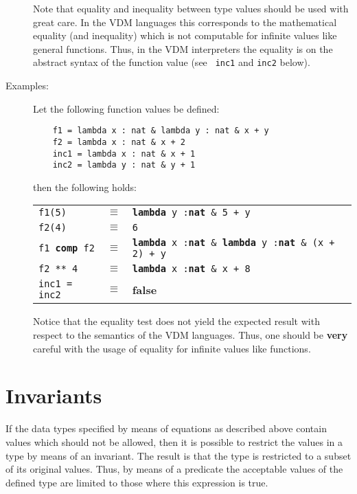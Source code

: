\documentclass{overturerepchap}
\newcommand{\keyw}[1]{{\bf\ttfamily #1}}
\begin{document}
\begin{description}
  Note that equality and inequality between type values should be used
  with great care. In the VDM languages this corresponds to the
  mathematical equality (and inequality) which is not computable for
  infinite values like general functions. Thus, in the
  VDM interpreters the
  equality is on the abstract syntax of the function value (see {\tt
    inc1} and {\tt inc2} below).



\item[Examples:] Let the following function values be defined:
  \begin{lstlisting}
    f1 = lambda x : nat & lambda y : nat & x + y
    f2 = lambda x : nat & x + 2
    inc1 = lambda x : nat & x + 1
    inc2 = lambda y : nat & y + 1
  \end{lstlisting}
  then the following holds:

  \begin{tabular}{lcl}
    {\tt f1(5)} &$\equiv$& {\tt \keyw{lambda} y :\keyw{nat} \& 5 + y}\\
    {\tt f2(4)} &$\equiv$& {\tt 6}\\
    {\tt f1 \keyw{comp} f2}&$\equiv$& {\tt \keyw{lambda} x :\keyw{nat} \&
      \keyw{lambda} y :\keyw{nat} \& (x + 2) + y}\\
    {\tt f2 ** 4}&$\equiv$& {\tt \keyw{lambda} x :\keyw{nat} \& x + 8}\\
    {\tt inc1 = inc2}&$\equiv$& \keyw{false}\\
  \end{tabular}

  Notice that the equality test does not yield the expected result with
  respect to the semantics of the VDM languages. Thus, one should
  be {\bf very} careful with the usage of equality for infinite values
  like functions.
\end{description}

\section{Invariants}

If the data types specified by means of equations as described above
contain values which should not be allowed, then it is possible to restrict
the values in a type by means of an invariant. The result is that the type
is restricted to a subset of its original values. Thus, by means of a
predicate the acceptable values of the defined type are limited to those
where this expression is true.
\end{document}
